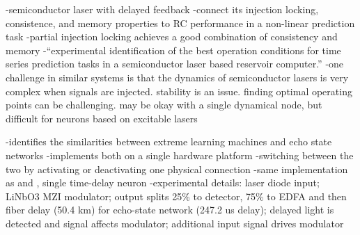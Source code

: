 \vspace{3em}
\cite{cosc2018} 

\vspace{3em}
\cite{rofi2017}

\vspace{3em}
\cite{bubr2017}
-semiconductor laser with delayed feedback
-connect its injection locking, consistence, and memory properties to RC performance in a non-linear prediction task
-partial injection locking achieves a good combination of consistency and memory
-``experimental identification of the best operation conditions for time series prediction tasks in a semiconductor laser based reservoir computer.''
-one challenge in similar systems is that the dynamics of semiconductor lasers is very complex when signals are injected. stability is an issue. finding optimal operating points can be challenging. may be okay with a single dynamical node, but difficult for neurons based on excitable lasers

\vspace{3em}
\cite{orso2015}
-identifies the similarities between extreme learning machines and echo state networks
-implements both on a single hardware platform
-switching between the two by activating or deactivating one physical connection
-same implementation as \cite{padu2012} and \cite{laso2012}, single time-delay neuron
-experimental details: laser diode input; LiNbO3 MZI modulator; output splits 25\% to detector, 75\% to EDFA and then fiber delay (50.4 km) for echo-state network (247.2 us delay); delayed light is detected and signal affects modulator; additional input signal drives modulator

\vspace{3em}
\cite{nate2017}

\vspace{3em}
\cite{laso2012}


